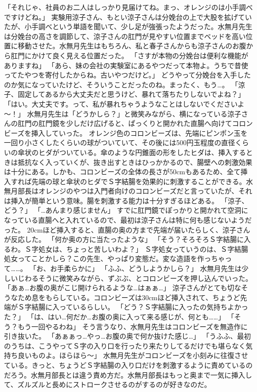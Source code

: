 「それじゃ、社員のお二人はしっかり見届けてね。まっ、オレンジのは小手調べですけどね。」
実験用涼子さん、もとい涼子さんは分娩台の上で大股を拡げていたが、小手調べという単語を聞いて、少し足が強張ったようだった。水無月先生は分娩台の高さを調節して、涼子さんの肛門が見やすい位置までベッドを高い位置に移動させた。水無月先生はもちろん、私と春子さんからも涼子さんのお腹から肛門にかけて良く見える位置だった。
「さすが本物の分娩台は便利な機能がありますね」
「あら、妹の会社の実験室にあるやつだって本物よ。うちで昔使ってたやつを寄付したからね。古いやつだけど。」
どうやって分娩台を入手したのか気になっていたけど、そういうことだったのね。まったく、もう…。
「涼子、固定してあるから大丈夫だと思うけど、暴れて落ちたりしないでよね？」
「はい。大丈夫です。って、私が暴れちゃうようなことはしないでくださいよ～！」
水無月先生は「どうかしら？」と微笑みながら、横になっている涼子さんの肛門の肛門鏡を少しだけ広げると、ぱっくりと開かれた直腸へ向けてコロンビーズを挿入していった。
オレンジ色のコロンビーズは、先端にピンポン玉を一回り小さくしたくらいの球がついていて、その後には500円玉程度の直径くらいの傘状のヒダがついている。傘のような円錐面の形をしたヒダは、挿入するときは抵抗なく入っていくが、抜き出すときはひっかかるので、腸壁への刺激効果は十分にある。しかも、コロンビーズの全体の長さが50cmもあるため、全て挿入すれば先端の球と傘状のヒダでＳ字結腸を効果的に刺激することができる。水無月部長はオレンジのやつは入門者向けのコロンビーズだと言っていたが、それは挿入が簡単という意味。腸を刺激する能力は十分すぎるほどある。
「涼子、どう？」
「…あんまり感じません」
すでに肛門鏡でぽっかりと開かれて空洞になっている直腸へと入れているので、最初は涼子さんは特に何も感じないようだった。
20cmほど挿入すると、直腸の奥の方まで先端が届いたらしく、涼子さんが反応した。
「何か奥の方に当たったような」
「そう？そろそろＳ字結腸に入るわ。Ｓ字処女は、ちょっと苦しいわよ？」
Ｓ字処女っていうのは、Ｓ字結腸処女ってことかしら？この先生、やっぱり変態だ。変な造語を作っちゃって……。
「お、お手柔らかに」
「ふふ、どうしようかしら？」
水無月先生は少しいじわるそうに微笑みながら、ずぶぶ、とコロンビーズを押し込んでいった。
「あぁ…お腹の奥がこじ開けられるような…はぁぁ…」
涼子さんがとても切なそうなため息をもらしている。コロンビーズは30cmほど挿入されて、ちょうど先端がＳ字結腸に入っているらしい。
「どう？Ｓ字結腸に入ったの気持ちよかった？」
「は、はい…何だか…お腹の奥に入って来る感じが、何とも……」
「そう？もう一回やるわね」
そう言うなり、水無月先生はコロンビーズを無造作に引き抜いた。
「あぁぁっ…やっ…お腹の奥で何か抜けた感じ…」
「うふふ、最初のうちは、こうやってＳ字の入り口を行ったり来たりしてるだけでも堪らなく気持ち良いものよ。ほらほら～」
水無月先生がコロンビーズを小刻みに往復させている。きっと、ちょうどＳ字結腸の入り口だけを刺激するように責めているのだろう。水無月部長とは違う責め方だ。水無月部長はもっと奥まで一気に挿入して、ズルズルと長めにストロークさせるのがするのが好きなのだ。
